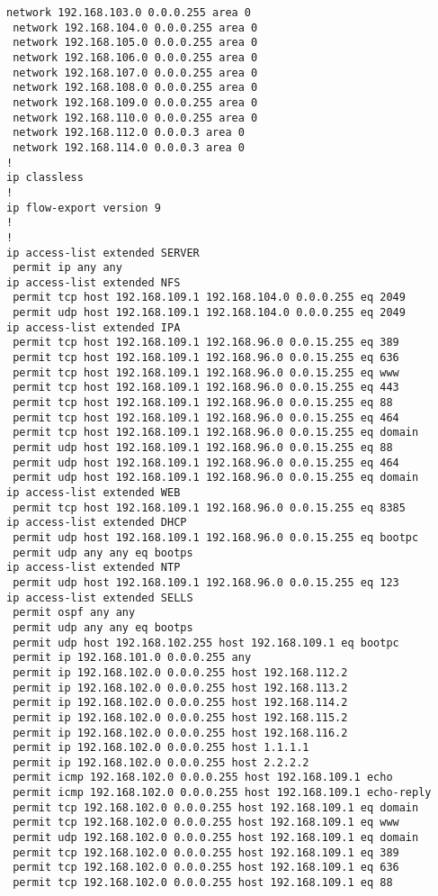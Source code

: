 \documentclass[14pt, a4paper]{extarticle}
\begin{document}
\begin{appendices}
\begin{lstlisting}[caption=Конфигурация устройства SW\_1\_L3\_IVANOV\label{list:conf_sw1_l3}]
 network 192.168.103.0 0.0.0.255 area 0
 network 192.168.104.0 0.0.0.255 area 0
 network 192.168.105.0 0.0.0.255 area 0
 network 192.168.106.0 0.0.0.255 area 0
 network 192.168.107.0 0.0.0.255 area 0
 network 192.168.108.0 0.0.0.255 area 0
 network 192.168.109.0 0.0.0.255 area 0
 network 192.168.110.0 0.0.0.255 area 0
 network 192.168.112.0 0.0.0.3 area 0
 network 192.168.114.0 0.0.0.3 area 0
!
ip classless
!
ip flow-export version 9
!
!
ip access-list extended SERVER
 permit ip any any
ip access-list extended NFS
 permit tcp host 192.168.109.1 192.168.104.0 0.0.0.255 eq 2049
 permit udp host 192.168.109.1 192.168.104.0 0.0.0.255 eq 2049
ip access-list extended IPA
 permit tcp host 192.168.109.1 192.168.96.0 0.0.15.255 eq 389
 permit tcp host 192.168.109.1 192.168.96.0 0.0.15.255 eq 636
 permit tcp host 192.168.109.1 192.168.96.0 0.0.15.255 eq www
 permit tcp host 192.168.109.1 192.168.96.0 0.0.15.255 eq 443
 permit tcp host 192.168.109.1 192.168.96.0 0.0.15.255 eq 88
 permit tcp host 192.168.109.1 192.168.96.0 0.0.15.255 eq 464
 permit tcp host 192.168.109.1 192.168.96.0 0.0.15.255 eq domain
 permit udp host 192.168.109.1 192.168.96.0 0.0.15.255 eq 88
 permit udp host 192.168.109.1 192.168.96.0 0.0.15.255 eq 464
 permit udp host 192.168.109.1 192.168.96.0 0.0.15.255 eq domain
ip access-list extended WEB
 permit tcp host 192.168.109.1 192.168.96.0 0.0.15.255 eq 8385
ip access-list extended DHCP
 permit udp host 192.168.109.1 192.168.96.0 0.0.15.255 eq bootpc
 permit udp any any eq bootps
ip access-list extended NTP
 permit udp host 192.168.109.1 192.168.96.0 0.0.15.255 eq 123
ip access-list extended SELLS
 permit ospf any any
 permit udp any any eq bootps
 permit udp host 192.168.102.255 host 192.168.109.1 eq bootpc
 permit ip 192.168.101.0 0.0.0.255 any
 permit ip 192.168.102.0 0.0.0.255 host 192.168.112.2
 permit ip 192.168.102.0 0.0.0.255 host 192.168.113.2
 permit ip 192.168.102.0 0.0.0.255 host 192.168.114.2
 permit ip 192.168.102.0 0.0.0.255 host 192.168.115.2
 permit ip 192.168.102.0 0.0.0.255 host 192.168.116.2
 permit ip 192.168.102.0 0.0.0.255 host 1.1.1.1
 permit ip 192.168.102.0 0.0.0.255 host 2.2.2.2
 permit icmp 192.168.102.0 0.0.0.255 host 192.168.109.1 echo
 permit icmp 192.168.102.0 0.0.0.255 host 192.168.109.1 echo-reply
 permit tcp 192.168.102.0 0.0.0.255 host 192.168.109.1 eq domain
 permit tcp 192.168.102.0 0.0.0.255 host 192.168.109.1 eq www
 permit udp 192.168.102.0 0.0.0.255 host 192.168.109.1 eq domain
 permit tcp 192.168.102.0 0.0.0.255 host 192.168.109.1 eq 389
 permit tcp 192.168.102.0 0.0.0.255 host 192.168.109.1 eq 636
 permit tcp 192.168.102.0 0.0.0.255 host 192.168.109.1 eq 88

\end{lstlisting}
\end{appendices}
\end{document}
